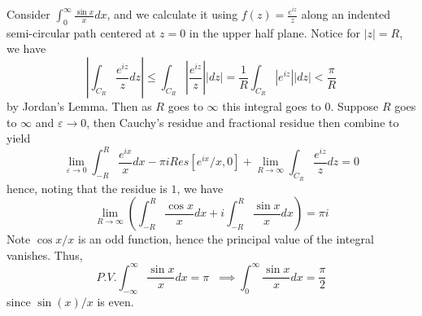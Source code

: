 \begin{example}
    Consider $\int_0^{\infty}\frac{\sin x}{x}dx$, and we calculate it using $f(z) = \frac{e^{iz}}{z}$ along an indented semi-circular path centered at $z = 0$ in the upper half plane. Notice for $|z| = R$, we have \begin{equation*}
        \left|\int_{C_R}\frac{e^{iz}}{z}dz\right| \leq \int_{C_R}\left|\frac{e^{iz}}{z}\right||dz| = \frac{1}{R}\int_{C_R}\left|e^{iz}\right||dz| < \frac{\pi}{R}
    \end{equation*}
    by Jordan's Lemma. Then as $R$ goes to $\infty$ this integral goes to $0$. Suppose $R$ goes to $\infty$ and $\varepsilon \rightarrow 0$, then Cauchy's residue and fractional residue then combine to yield \begin{equation*}
        \lim\limits_{\varepsilon\rightarrow 0}\int_{-R}^R\frac{e^{ix}}{x}dx - \pi iRes[e^{ix}/x, 0] + \lim\limits_{R\rightarrow \infty}\int_{C_R}\frac{e^{iz}}{z}dz = 0
    \end{equation*}
    hence, noting that the residue is $1$, we have \begin{equation*}
        \lim\limits_{R\rightarrow \infty}\left(\int_{-R}^{R}\frac{\cos x}{x}dx + i\int_{-R}^{R}\frac{\sin x}{x}dx\right) = \pi i
    \end{equation*}
    Note $\cos x/x$ is an odd function, hence the principal value of the integral vanishes. Thus, \begin{equation*}
        P.V.\int_{-\infty}^{\infty}\frac{\sin x}{x}dx = \pi\;\;\implies \int_0^{\infty}\frac{\sin x}{x}dx = \frac{\pi}{2}
    \end{equation*}
    since $\sin(x)/x$ is even.
\end{example}






